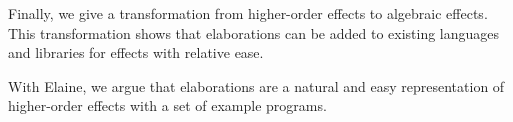 Finally, we give a transformation from higher-order effects to algebraic effects. This transformation shows that elaborations can be added to existing languages and libraries for effects with relative ease.

With Elaine, we argue that elaborations are a natural and easy representation of higher-order effects with a set of example programs.
